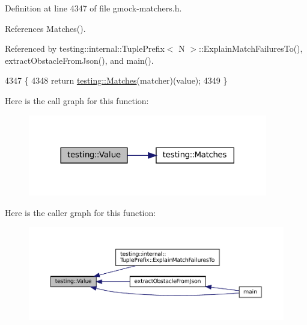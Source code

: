 Definition at line 4347 of file gmock-\/matchers.\+h.



References Matches().



Referenced by testing\+::internal\+::\+Tuple\+Prefix$<$ N $>$\+::\+Explain\+Match\+Failures\+To(), extract\+Obstacle\+From\+Json(), and main().


\begin{DoxyCode}
4347                                              \{
4348   \textcolor{keywordflow}{return} \hyperlink{namespacetesting_ad53b509ae9cd51040d67f668f99702ae}{testing::Matches}(matcher)(value);
4349 \}
\end{DoxyCode}
Here is the call graph for this function\+:
\nopagebreak
\begin{figure}[H]
\begin{center}
\leavevmode
\includegraphics[width=296pt]{namespacetesting_ae44c50a3a7f0a46f05c8a0b0592b4a62_cgraph}
\end{center}
\end{figure}
Here is the caller graph for this function\+:
\nopagebreak
\begin{figure}[H]
\begin{center}
\leavevmode
\includegraphics[width=350pt]{namespacetesting_ae44c50a3a7f0a46f05c8a0b0592b4a62_icgraph}
\end{center}
\end{figure}
\mbox{\label{namespacetesting_aabfc320cc132d0a1da2a255b45a17b7a}} 
